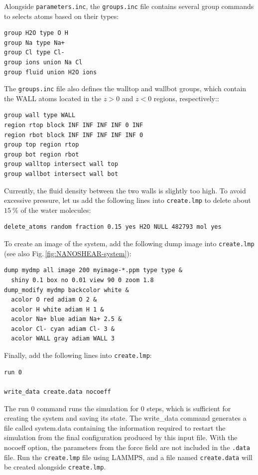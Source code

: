 \documentclass[9pt,tutorial]{livecoms}
\newcommand{\lmpcmd}[1]{\hspace{0pt}\colorbox{listing}{\textcolor{command}{\small{#1}}}\hspace{0pt}} %
\newcommand{\flecmd}[1]{\textcolor{command}{\texttt{#1}}} %
\begin{document}
Alongside \flecmd{parameters.inc}, the \flecmd{groups.inc} file contains
several \lmpcmd{group} commands to selects atoms based on their types:
\begin{lstlisting}
group H2O type O H
group Na type Na+
group Cl type Cl-
group ions union Na Cl
group fluid union H2O ions
\end{lstlisting}
The \flecmd{groups.inc} file also defines the \lmpcmd{walltop} and \lmpcmd{wallbot}
groups, which contain the WALL atoms located in the $z > 0$ and $z < 0$ regions, respectively::
\begin{lstlisting}
group wall type WALL
region rtop block INF INF INF INF 0 INF
region rbot block INF INF INF INF INF 0
group top region rtop
group bot region rbot
group walltop intersect wall top
group wallbot intersect wall bot
\end{lstlisting}

Currently, the fluid density between the two walls is slightly too high.  To avoid
excessive pressure, let us add the following lines into \flecmd{create.lmp}
to delete about $15~\%$ of the water molecules:
\begin{lstlisting}
delete_atoms random fraction 0.15 yes H2O NULL 482793 mol yes
\end{lstlisting}

To create an image of the system, add the following \lmpcmd{dump} image
into \flecmd{create.lmp} (see also Fig.\,\ref{fig:NANOSHEAR-system}):
\begin{lstlisting}
dump mydmp all image 200 myimage-*.ppm type type &
  shiny 0.1 box no 0.01 view 90 0 zoom 1.8
dump_modify mydmp backcolor white &
  acolor O red adiam O 2 &
  acolor H white adiam H 1 &
  acolor Na+ blue adiam Na+ 2.5 &
  acolor Cl- cyan adiam Cl- 3 &
  acolor WALL gray adiam WALL 3
\end{lstlisting}

Finally, add the following lines into \flecmd{create.lmp}:
\begin{lstlisting}
run 0

write_data create.data nocoeff
\end{lstlisting}
The \lmpcmd{run 0} command runs the simulation for 0 steps, which is sufficient for
creating the system and saving its state.  The \lmpcmd{write\_data} command
generates a file called \lmpcmd{system.data} containing the information required
to restart the simulation from the final configuration produced by this input
file.  With the \lmpcmd{nocoeff} option, the parameters from the force field are
not included in the \flecmd{.data} file.  Run the \flecmd{create.lmp} file using LAMMPS,
and a file named \flecmd{create.data} will be created alongside \flecmd{create.lmp}.
\end{document}
